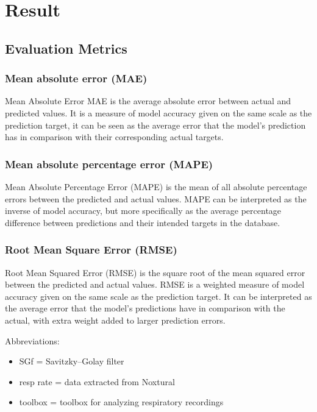 \chapter{Result}

\section{Evaluation Metrics}
\subsection{Mean absolute error (MAE)}
Mean Absolute Error MAE is the average absolute error between actual and predicted values.  It is a measure of model accuracy given on the same scale as the prediction target, it can be seen as the average error that the model's prediction has in comparison with their corresponding actual targets.


\subsection {Mean absolute percentage error (MAPE)} 
Mean Absolute Percentage Error (MAPE) is the mean of all absolute percentage errors between the predicted and actual values.
MAPE can be interpreted as the inverse of model accuracy, but more specifically as the average percentage difference between predictions and their intended targets in the database.


 \subsection{Root Mean Square Error (RMSE) }
 Root Mean Squared Error (RMSE) is the square root of the mean squared error between the predicted and actual values.
 RMSE is a weighted measure of model accuracy given on the same scale as the prediction target. It can be interpreted as the average error that the model’s predictions have in comparison with the actual, with extra weight added to larger prediction errors.
 
 Abbreviations:
\begin{itemize}
    \item SGf = Savitzky–Golay filter
    \item resp rate = data extracted from Noxtural
    \item toolbox = toolbox for analyzing respiratory recordings \cite{Noto2018AutomatedToolbox}
\end{itemize}

